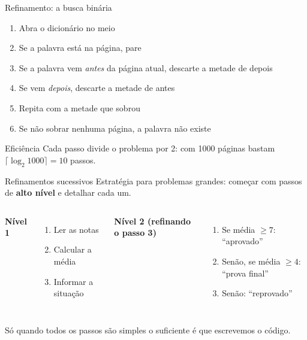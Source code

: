 \documentclass[aspectratio=169,10pt,t]{beamer}
\begin{document}
\begin{frame}{Refinamento: a busca binária}
  \begin{enumerate}
    \item Abra o dicionário no meio
    \item Se a palavra está na página, \alert{pare}
    \item Se a palavra vem \emph{antes} da página atual, descarte a metade de depois
    \item Se vem \emph{depois}, descarte a metade de antes
    \item Repita com a metade que sobrou
    \item Se não sobrar nenhuma página, a palavra \alert{não existe}
  \end{enumerate}
  \vspace{1ex}
  \begin{exampleblock}{Eficiência}
    Cada passo divide o problema por 2: com 1000 páginas bastam \(\lceil\log_2 1000\rceil = 10\) passos.
  \end{exampleblock}
\end{frame}

\begin{frame}{Refinamentos sucessivos}
  Estratégia para problemas grandes: começar com passos de \textbf{alto nível} e detalhar cada um.
  \vspace{1ex}
  \begin{columns}[T]
    \textbf{Nível 1}
    \begin{enumerate}
      \item Ler as notas
      \item Calcular a média
      \item Informar a situação
    \end{enumerate}
    \textbf{Nível 2 (refinando o passo 3)}
    \begin{enumerate}
      \item[3.1] Se média \(\ge 7\): ``aprovado''
      \item[3.2] Senão, se média \(\ge 4\): ``prova final''
      \item[3.3] Senão: ``reprovado''
    \end{enumerate}
  \end{columns}
  \vspace{1ex}
  \footnotesize Só quando todos os passos são simples o suficiente é que escrevemos o código.
\end{frame}
\end{document}
